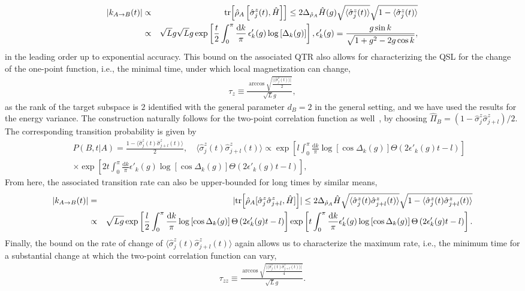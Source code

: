 \documentclass[prl,aps,amssymb,twocolumn,superscriptaddress, notitlepage, longbibliography]{revtex4-2}
\begin{document}
\begin{eqnarray}
    \lvert k_{A\rightarrow B}(t)\rvert&\propto&\tr[\hat\rho_A\left[\hat\sigma^z_j(t),\hat H\right]]\leq2\Delta_{\hat\rho_A}\hat H(g)\sqrt{\langle\hat\sigma^z_j(t)\rangle}\sqrt{1-\langle\hat\sigma^z_j(t)\rangle}\\
    &\propto&\sqrt Lg\sqrt Lg\exp\left[\frac{t}{2}\int_0^\pi\frac{\mathrm dk}{\pi}\,\epsilon'_k(g)\log\left[\Delta_k(g)\right]\right],\epsilon'_k(g)=\frac{g\sin k}{\sqrt{1+g^2-2g\cos k}},\nonumber
\end{eqnarray}
in the leading order up to exponential accuracy.
This bound on the associated QTR also allows for characterizing the QSL for the change of the one-point function, i.e., the minimal time, under which local magnetization can change,
\begin{eqnarray}
\tau_z\equiv\frac{\arccos{\sqrt{\frac{\lvert\langle\hat\sigma^z_j(t)\rangle\rvert}{2}}}}{\sqrt Lg},
\end{eqnarray}
as the rank of the target subspace is $2$ identified with the general parameter $d_B=2$ in the general setting, and we have used the results for the energy variance.
The construction naturally follows for the two-point correlation function as well~\cite{Calabrese_PRL2011}, by choosing $\hat\Pi_B=(1-\hat\sigma^z_j\hat\sigma^z_{j+l})/2$. The corresponding transition probability is given by
\begin{eqnarray}
    &&P(B,t\vert A)=\frac{1-\langle\hat\sigma^z_j(t)\hat\sigma^z_{j+l}(t)\rangle}{2},\quad\langle\hat\sigma^z_j(t)\hat\sigma^z_{j+l}(t)\rangle\propto \exp\left[l\int_0^\pi\frac{\mathrm dk}{\pi}\log\left[\cos\Delta_k(g)\right]\Theta\left(2\epsilon'_k(g)t-l\right)\right]\nonumber\\
    &&\times\exp\left[2t\int_0^\pi\frac{\mathrm dk}{\pi}\epsilon'_k(g)\log\left[\cos\Delta_k(g)\right]\Theta\left(2\epsilon'_k(g)t-l\right)\right],
\end{eqnarray}
From here, the associated transition rate can also be upper-bounded for long times by similar means,
\begin{eqnarray}
    \lvert k_{A\rightarrow B}(t)\rvert&=&\lvert\tr[\hat\rho_A[\hat\sigma^z_j\hat\sigma^z_{j+l},\hat H]]\rvert\leq 2\Delta_{\hat\rho_A} \hat H\sqrt{\langle\hat\sigma^z_j(t)\hat\sigma^z_{j+l}(t)\rangle}\sqrt{1-\langle\hat\sigma^z_j(t)\hat\sigma^z_{j+l}(t)\rangle}\\
    &\propto& \sqrt{Lg}\exp\left[\frac{l}{2}\int_0^\pi\frac{\mathrm dk}{\pi}\log\left[\cos\Delta_k(g)\right]\Theta\left(2\epsilon'_k(g)t-l\right)\right]\exp\left[t\int_0^\pi\frac{\mathrm dk}{\pi}\epsilon'_k(g)\log\left[\cos\Delta_k(g)\right]\Theta\left(2\epsilon'_k(g)t-l\right)\right].\nonumber
\end{eqnarray}
Finally, the bound on the rate of change of $\langle\hat\sigma^z_j(t)\hat\sigma^z_{j+l}(t)\rangle$ again allows us to characterize the maximum rate, i.e., the minimum time for a substantial change at which the two-point correlation function can vary,
\begin{eqnarray}
    \tau_{zz}\equiv \frac{\arccos\sqrt{\frac{\lvert\langle\hat\sigma^z_j(t)\hat\sigma^z_{j+l}(t)\rangle\rvert}{4}}}{\sqrt{L}g}.
\end{eqnarray}
\end{document}
